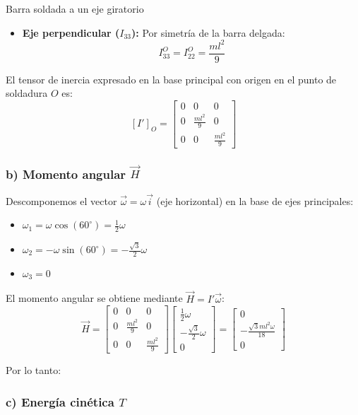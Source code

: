 \begin{solucion}{Barra soldada a un eje giratorio}
\begin{itemize}
    \item \textbf{Eje perpendicular ($I_{33}$):} Por simetría de la barra delgada:
    $$I_{33}^O = I_{22}^O = \frac{ml^2}{9}$$
\end{itemize}

El tensor de inercia expresado en la base principal con origen en el punto de soldadura $O$ es:
\[ [I']_O = \begin{bmatrix}
    0 & 0 & 0 \\
    0 & \frac{ml^2}{9} & 0 \\
    0 & 0 & \frac{ml^2}{9}
    \end{bmatrix} \]

\subsubsection*{b) Momento angular $\vec{H}$}

Descomponemos el vector $\vec{\omega} = \omega \vec{i}$ (eje horizontal) en la base de ejes principales:
\begin{itemize}
    \item $\omega_1 = \omega \cos(60^\circ) = \frac{1}{2}\omega$
    \item $\omega_2 = -\omega \sin(60^\circ) = -\frac{\sqrt{3}}{2}\omega$
    \item $\omega_3 = 0$
\end{itemize}

El momento angular se obtiene mediante $\vec{H} = I' \vec{\omega}$:
\[ \vec{H} = \begin{bmatrix} 0 & 0 & 0 \\ 0 & \frac{ml^2}{9} & 0 \\ 0 & 0 & \frac{ml^2}{9} \end{bmatrix} \begin{bmatrix} \frac{1}{2}\omega \\ -\frac{\sqrt{3}}{2}\omega \\ 0 \end{bmatrix} = \begin{bmatrix} 0 \\ -\frac{\sqrt{3}ml^2\omega}{18} \\ 0 \end{bmatrix} \]

Por lo tanto:

\subsubsection*{c) Energía cinética $T$}


\end{solucion}
